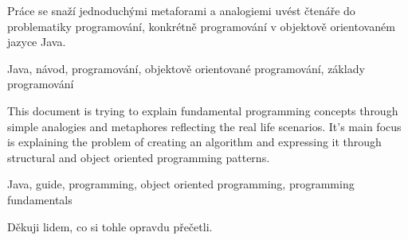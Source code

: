 \begin{abstractCZ}
	Práce se snaží jednoduchými metaforami a analogiemi uvést čtenáře do problematiky programování, konkrétně programování v objektově orientovaném jazyce Java.
\end{abstractCZ}


\begin{keywordsCZ}
	Java, návod, programování, objektově orientované programování, základy programování
\end{keywordsCZ}

\vspace{2cm}

\begin{abstractEN}
	This document is trying to explain fundamental programming concepts through simple analogies and metaphores reflecting the real life scenarios. It's main focus is explaining the problem of creating an algorithm and expressing it through structural and object oriented programming patterns.
\end{abstractEN}

\begin{keywordsEN}
	Java, guide, programming, object oriented programming, programming fundamentals
\end{keywordsEN}

\begin{acknowledgement}
	Děkuji lidem, co si tohle opravdu přečetli.
\end{acknowledgement}